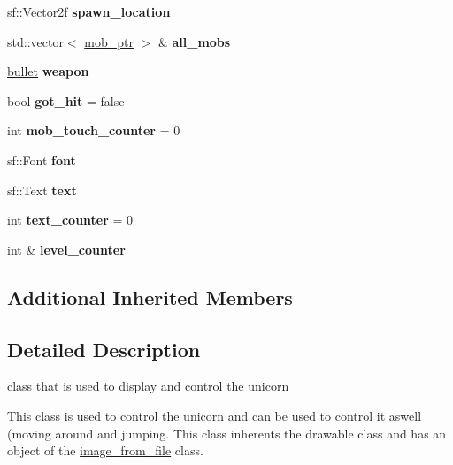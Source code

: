 \begin{DoxyCompactItemize}
\mbox{\label{classunicorn_ab16638b1ce0d1a7a0da9ecffc6370e8c}} 
sf\+::\+Vector2f {\bfseries spawn\+\_\+location}
\item 
\mbox{\label{classunicorn_aac73bd105ef4ee4c7d46727a7e832bcf}} 
std\+::vector$<$ \hyperlink{typedefs_8hpp_a09ee7f853fc9bc830a9445a06fd53d4b}{mob\+\_\+ptr} $>$ \& {\bfseries all\+\_\+mobs}
\item 
\mbox{\label{classunicorn_a3e51a9e196533b27304f21eb26d8f4ba}} 
\hyperlink{classbullet}{bullet} {\bfseries weapon}
\item 
\mbox{\label{classunicorn_ab808840ba1e83cb34c691ba2472d6f9b}} 
bool {\bfseries got\+\_\+hit} = false
\item 
\mbox{\label{classunicorn_ac0762399be7cd26263456d86fd2774ff}} 
int {\bfseries mob\+\_\+touch\+\_\+counter} = 0
\item 
\mbox{\label{classunicorn_ac4e77e1b0fa4f0812cce288f5d90897b}} 
sf\+::\+Font {\bfseries font}
\item 
\mbox{\label{classunicorn_a141d43a06ed4ba77c0aa891e0cf01b73}} 
sf\+::\+Text {\bfseries text}
\item 
\mbox{\label{classunicorn_a7e53b65e44f4909ecedda128161673b6}} 
int {\bfseries text\+\_\+counter} = 0
\item 
\mbox{\label{classunicorn_a4b92a71eb730de05a72d7963bfe13254}} 
int \& {\bfseries level\+\_\+counter}
\end{DoxyCompactItemize}
\subsection*{Additional Inherited Members}


\subsection{Detailed Description}
class that is used to display and control the unicorn 

This class is used to control the unicorn and can be used to control it aswell (moving around and jumping. This class inherents the drawable class and has an object of the \hyperlink{classimage__from__file}{image\+\_\+from\+\_\+file} class.

